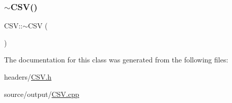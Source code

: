 \subsubsection{\texorpdfstring{$\sim$\+C\+S\+V()}{~CSV()}}
{\footnotesize\ttfamily C\+S\+V\+::$\sim$\+C\+SV (\begin{DoxyParamCaption}{ }\end{DoxyParamCaption})}



The documentation for this class was generated from the following files\+:\begin{DoxyCompactItemize}
\item 
headers/\hyperlink{_c_s_v_8h}{C\+S\+V.\+h}\item 
source/output/\hyperlink{_c_s_v_8cpp}{C\+S\+V.\+cpp}\end{DoxyCompactItemize}
